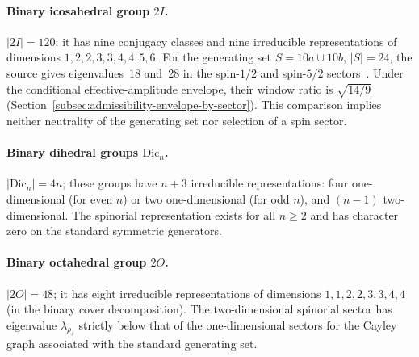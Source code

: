   \paragraph{Binary icosahedral group $2I$.}
    $|2I|=120$; it has nine conjugacy classes and nine irreducible representations of
    dimensions $1,2,2,3,3,4,4,5,6$.
    For the generating set $S=10a\cup10b$, $|S|=24$, the source gives eigenvalues~18 and~28
    in the spin-$1/2$ and spin-$5/2$ sectors~\cite{Beau2026a1}.
    Under the conditional effective-amplitude envelope, their window ratio is $\sqrt{14/9}$
    (Section~\ref{subsec:admissibility-envelope-by-sector}).
    This comparison implies neither neutrality of the generating set nor selection of a spin sector.

  \paragraph{Binary dihedral groups $\mathrm{Dic}_n$.}
    $|\mathrm{Dic}_n|=4n$; these groups have $n+3$ irreducible representations:
    four one-dimensional (for even $n$) or two one-dimensional (for odd $n$), and
    $(n-1)$ two-dimensional.
    The spinorial representation exists for all $n\geq 2$ and has character zero on
    the standard symmetric generators.

  \paragraph{Binary octahedral group $2O$.}
    $|2O|=48$; it has eight irreducible representations of dimensions
    $1,1,2,2,3,3,4,4$ (in the binary cover decomposition).
    The two-dimensional spinorial sector has eigenvalue $\lambda_{\rho_s}$ strictly
    below that of the one-dimensional sectors for the Cayley graph associated with
    the standard generating set.
